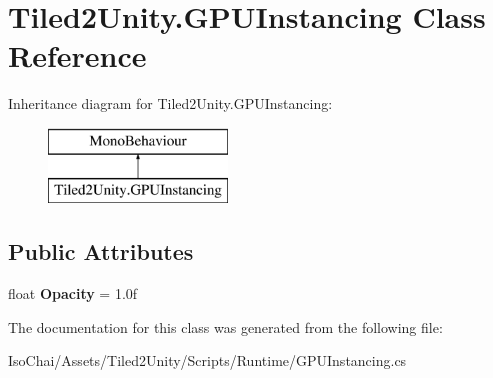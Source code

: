 \hypertarget{class_tiled2_unity_1_1_g_p_u_instancing}{}\section{Tiled2\+Unity.\+G\+P\+U\+Instancing Class Reference}
\label{class_tiled2_unity_1_1_g_p_u_instancing}
Inheritance diagram for Tiled2\+Unity.\+G\+P\+U\+Instancing\+:\begin{figure}[H]
\begin{center}
\leavevmode
\includegraphics[height=2.000000cm]{class_tiled2_unity_1_1_g_p_u_instancing}
\end{center}
\end{figure}
\subsection*{Public Attributes}
\begin{DoxyCompactItemize}
\item 
\mbox{\label{class_tiled2_unity_1_1_g_p_u_instancing_a3d9886fd691a897ed1ed57bd247e6e18}} 
float {\bfseries Opacity} = 1.\+0f
\end{DoxyCompactItemize}


The documentation for this class was generated from the following file\+:\begin{DoxyCompactItemize}
\item 
Iso\+Chai/\+Assets/\+Tiled2\+Unity/\+Scripts/\+Runtime/G\+P\+U\+Instancing.\+cs\end{DoxyCompactItemize}
